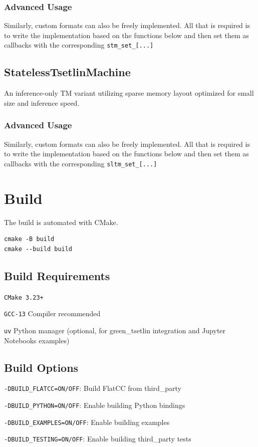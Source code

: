 \subsubsection{Advanced Usage}
Similarly, custom formats can also be freely implemented. All that is required is to write the implementation based on the functions below and then set them as callbacks with the corresponding \texttt{stm\_set\_[...]}

\subsection{StatelessTsetlinMachine}
An inference-only TM variant utilizing sparse memory layout optimized for small size and inference speed.

\subsubsection{Advanced Usage}
Similarly, custom formats can also be freely implemented. All that is required is to write the implementation based on the functions below and then set them as callbacks with the corresponding \texttt{sltm\_set\_[...]} 

\section{Build}
The build is automated with CMake.

\begin{listing}[!htbp]
    \caption{Project build commands\label{lst:build-commands}}
    \begin{verbatim}
cmake -B build
cmake --build build
    \end{verbatim}
\end{listing}
\FloatBarrier

\subsection{Build Requirements}
\begin{compactitem}
    \item \texttt{CMake 3.23+}
    \item \texttt{GCC-13} Compiler recommended
    \item \texttt{uv} Python manager (optional, for green\_tsetlin integration and Jupyter Notebooks examples)
\end{compactitem}

\subsection{Build Options}
\begin{compactitem}
    \item \texttt{-DBUILD\_FLATCC=ON/OFF}: Build FlatCC from third\_party
    \item \texttt{-DBUILD\_PYTHON=ON/OFF}: Enable building Python bindings
    \item \texttt{-DBUILD\_EXAMPLES=ON/OFF}: Enable building examples
    \item \texttt{-DBUILD\_TESTING=ON/OFF}: Enable building third\_party tests
\end{compactitem}

